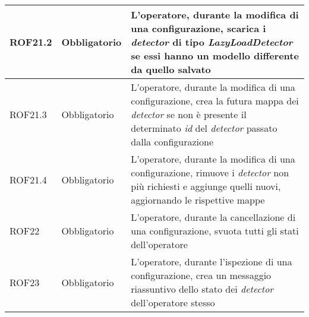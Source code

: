 {\begin{longtable}{L{3cm} L{3cm} L{7.5cm}}
\hline
ROF21.2 & Obbligatorio & L'operatore, durante la modifica di una configurazione, scarica i \textit{detector} di tipo \textit{LazyLoadDetector} se essi hanno un modello differente da quello salvato\\
\hline
ROF21.3 & Obbligatorio & L'operatore, durante la modifica di una configurazione, crea la futura mappa dei \textit{detector} se non è presente il determinato \textit{id} del \textit{detector} passato dalla configurazione\\
\hline
ROF21.4 & Obbligatorio & L'operatore, durante la modifica di una configurazione, rimuove i \textit{detector} non più richiesti e aggiunge quelli nuovi, aggiornando le rispettive mappe\\
\hline
ROF22 & Obbligatorio & L'operatore, durante la cancellazione di una configurazione, svuota tutti gli stati dell'operatore\\
\hline
ROF23 & Obbligatorio & L'operatore, durante l'ispezione di una configurazione, crea un messaggio riassuntivo dello stato dei \textit{detector} dell'operatore stesso\\
\hline
\end{longtable}
}

